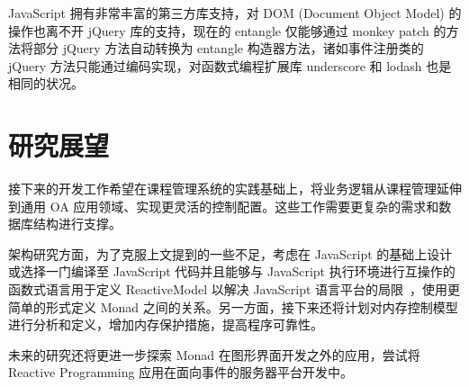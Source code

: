 JavaScript 拥有非常丰富的第三方库支持，对 DOM (Document Object Model) 的操作也离不开 jQuery 库的支持，现在的 entangle 仅能够通过 monkey patch 的方法将部分 jQuery 方法自动转换为 entangle 构造器方法，诸如事件注册类的 jQuery 方法只能通过编码实现，对函数式编程扩展库 underscore 和 lodash 也是相同的状况。

\section{研究展望}

接下来的开发工作希望在课程管理系统的实践基础上，将业务逻辑从课程管理延伸到通用 OA 应用领域、实现更灵活的控制配置。这些工作需要更复杂的需求和数据库结构进行支撑。

架构研究方面，为了克服上文提到的一些不足，考虑在 JavaScript 的基础上设计或选择一门编译至 JavaScript 代码并且能够与 JavaScript 执行环境进行互操作的函数式语言用于定义 ReactiveModel 以解决 JavaScript 语言平台的局限~\cite{Freeman:2012:HLW:2480361.2371413}，使用更简单的形式定义 Monad 之间的关系。另一方面，接下来还将计划对内存控制模型进行分析和定义，增加内存保护措施，提高程序可靠性。

未来的研究还将更进一步探索 Monad 在图形界面开发之外的应用，尝试将 Reactive Programming 应用在面向事件的服务器平台开发中。

